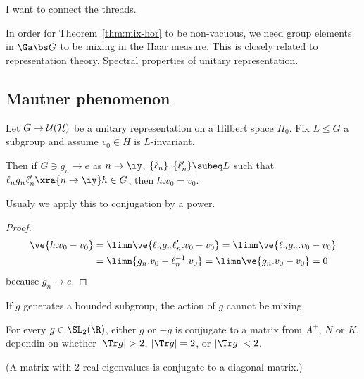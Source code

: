 I want to connect the threads. %


In order for Theorem~\ref{thm:mix-hor} to be non-vacuous, we need group elements in $\Ga\bs G$ to be mixing in the Haar measure. This is closely related to representation theory. Spectral properties of unitary representation. 

\subsection{Mautner phenomenon}

\begin{lem}
Let $G\to \cal U(H)$ be a unitary representation on a Hilbert space $H_0$. Fix $L\le G$ a subgroup and assume $v_0\in H$ is $L$-invariant. 

Then if $G\ni g_n\to e$ as $n\to \iy$, $\{\ell_n\},\{\ell_n'\}\subeq L$ such that $\ell_ng_n\ell_n'\xra{n\to \iy} h\in G$, then $h. v_0=v_0$.
\end{lem}

Usualy we apply this to conjugation by a power.

\begin{proof}
\begin{align}
\ve{h.v_0-v_0}
&= \limn \ve{\ell_n g_n\ell_n' . v_0-v_0}
=\limn \ve{\ell_n g_n.v_0 - v_0}\\
&=
\limn{g_n.v_0-\ell_n^{-1}.v_0} =  \limn \ve{g_n.v_0-v_0}=0
\end{align}
because $g_n\to e$. 
\end{proof}
If $g$ generates a bounded subgroup, the action of $g$ cannot be mixing.

\begin{lem}
For every $g\in \SL_2(\R)$, either $g$ or $-g$ is conjugate to a matrix from $A^+$, $N$ or $K$, dependin on whether $|\Tr g|>2$, $|\Tr g|=2$, or $|\Tr g|<2$.
\end{lem}
(A matrix with 2 real eigenvalues is conjugate to a diagonal matrix.)

